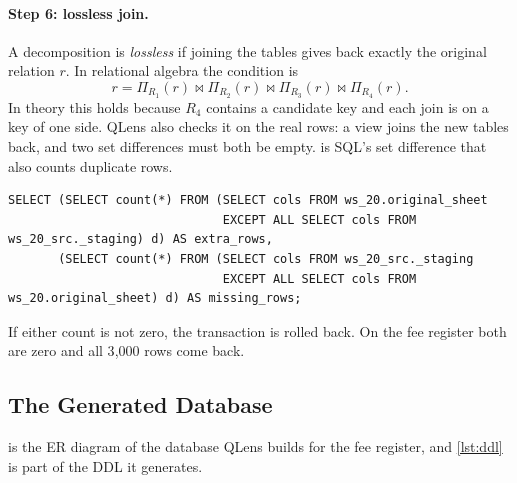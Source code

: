 \paragraph{Step 6: lossless join.} A decomposition is \emph{lossless} if joining the tables gives back
exactly the original relation $r$. In relational algebra the condition is
\[ r = \Pi_{R_1}(r) \bowtie \Pi_{R_2}(r) \bowtie \Pi_{R_3}(r) \bowtie \Pi_{R_4}(r). \]
In theory this holds because $R_4$ contains a candidate key and each join is on a key of one side. QLens
also checks it on the real rows: a view  joins the new tables back, and two set
differences must both be empty.  is SQL's set difference that also counts duplicate rows.

\begin{lstlisting}[float=tbp,caption={[Lossless-join check]Lossless-join check for the fee register (\code{cols} stands for the eight sheet columns)},label={lst:lossless}]
SELECT (SELECT count(*) FROM (SELECT cols FROM ws_20.original_sheet
                              EXCEPT ALL SELECT cols FROM ws_20_src._staging) d) AS extra_rows,
       (SELECT count(*) FROM (SELECT cols FROM ws_20_src._staging
                              EXCEPT ALL SELECT cols FROM ws_20.original_sheet) d) AS missing_rows;
\end{lstlisting}

If either count is not zero, the transaction is rolled back. On the fee register both are zero and all
3{,}000 rows come back.

\subsection{The Generated Database}
\label{sec:design-apply}

 is the ER diagram of the database QLens builds for the fee register, and
\cref{lst:ddl} is part of the DDL it generates.


